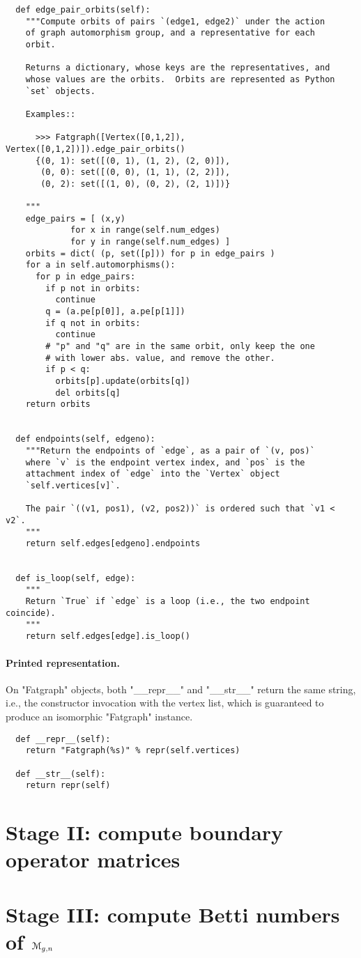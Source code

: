 \begin{lstlisting}
  def edge_pair_orbits(self):
    """Compute orbits of pairs `(edge1, edge2)` under the action
    of graph automorphism group, and a representative for each
    orbit.
    
    Returns a dictionary, whose keys are the representatives, and
    whose values are the orbits.  Orbits are represented as Python
    `set` objects.

    Examples::

      >>> Fatgraph([Vertex([0,1,2]), Vertex([0,1,2])]).edge_pair_orbits()
      {(0, 1): set([(0, 1), (1, 2), (2, 0)]),
       (0, 0): set([(0, 0), (1, 1), (2, 2)]),
       (0, 2): set([(1, 0), (0, 2), (2, 1)])}
      
    """
    edge_pairs = [ (x,y) 
             for x in range(self.num_edges)
             for y in range(self.num_edges) ]
    orbits = dict( (p, set([p])) for p in edge_pairs )
    for a in self.automorphisms():
      for p in edge_pairs:
        if p not in orbits:
          continue
        q = (a.pe[p[0]], a.pe[p[1]])
        if q not in orbits:
          continue
        # "p" and "q" are in the same orbit, only keep the one
        # with lower abs. value, and remove the other.
        if p < q:
          orbits[p].update(orbits[q])
          del orbits[q]
    return orbits


  def endpoints(self, edgeno):
    """Return the endpoints of `edge`, as a pair of `(v, pos)`
    where `v` is the endpoint vertex index, and `pos` is the
    attachment index of `edge` into the `Vertex` object
    `self.vertices[v]`.

    The pair `((v1, pos1), (v2, pos2))` is ordered such that `v1 < v2`.
    """
    return self.edges[edgeno].endpoints


  def is_loop(self, edge):
    """
    Return `True` if `edge` is a loop (i.e., the two endpoint coincide).
    """
    return self.edges[edge].is_loop()
\end{lstlisting}


\paragraph{Printed representation.}
On "Fatgraph" objects, both "__repr__" and "__str__" return the
same string, i.e., the constructor invocation with the vertex list,
which is guaranteed to produce an isomorphic "Fatgraph" instance.
\begin{lstlisting}
  def __repr__(self):
    return "Fatgraph(%s)" % repr(self.vertices)
  
  def __str__(self):
    return repr(self)

\end{lstlisting}



\section[Stage II]{Stage II: compute boundary operator matrices}
\label{sec:stage-ii}

\section[Stage III]{Stage III: compute Betti numbers of $\mathcal{M}_{g,n}$}
\label{sec:stage-iii}



